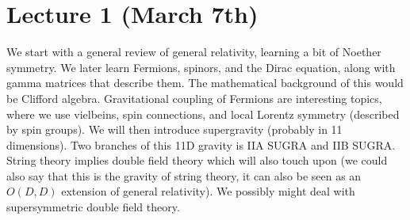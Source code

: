 \section{Lecture 1 (March 7th)}
We start with a general review of general relativity, learning a bit of Noether symmetry. We later learn Fermions, spinors, and the Dirac equation, along with gamma matrices that describe them. The mathematical background of this would be Clifford algebra. Gravitational coupling of Fermions are interesting topics, where we use vielbeins, spin connections, and local Lorentz symmetry (described by spin groups). We will then introduce supergravity (probably in 11 dimensions). Two branches of this 11D gravity is IIA SUGRA and IIB SUGRA. String theory implies double field theory which will also touch upon (we could also say that this is the gravity of string theory, it can also be seen as an $O(D,D)$ extension of general relativity). We possibly might deal with supersymmetric double field theory.
\\
